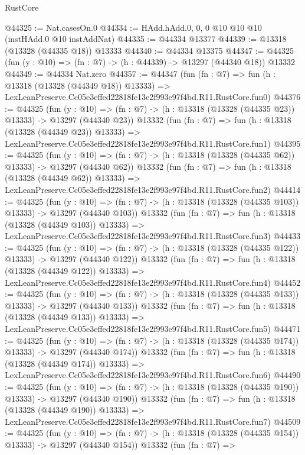 \begin{lexlean}{RustCore}
\begin{coremodule}
@44325 := Nat.casesOn.{0}
@44334 := HAdd.hAdd.{0, 0, 0} @10 @10 @10 (instHAdd.{0} @10 instAddNat)
@44335 := @44334 @13377
@44339 := @13318 (@13328 (@44335 @18)) @13333
@44340 := @44334 @13375
@44347 := @44325 (fun (y : @10) => (fn : @7) -> (h : @44339) -> @13297 (@44340 @18)) @13332
@44349 := @44334 Nat.zero
@44357 := @44347
    (fun (fn : @7) =>
    fun (h : @13318 (@13328 (@44349 @18)) @13333) =>
    LexLeanPreserve.Cc05e3effed22818fe13e2f993e97f4bd.R11.RustCore.fun0)
@44376 := @44325
    (fun (y : @10) => (fn : @7) -> (h : @13318 (@13328 (@44335 @23)) @13333) -> @13297 (@44340 @23))
    @13332
    (fun (fn : @7) =>
    fun (h : @13318 (@13328 (@44349 @23)) @13333) =>
    LexLeanPreserve.Cc05e3effed22818fe13e2f993e97f4bd.R11.RustCore.fun1)
@44395 := @44325
    (fun (y : @10) => (fn : @7) -> (h : @13318 (@13328 (@44335 @62)) @13333) -> @13297 (@44340 @62))
    @13332
    (fun (fn : @7) =>
    fun (h : @13318 (@13328 (@44349 @62)) @13333) =>
    LexLeanPreserve.Cc05e3effed22818fe13e2f993e97f4bd.R11.RustCore.fun2)
@44414 := @44325
    (fun (y : @10) =>
    (fn : @7) -> (h : @13318 (@13328 (@44335 @103)) @13333) -> @13297 (@44340 @103))
    @13332
    (fun (fn : @7) =>
    fun (h : @13318 (@13328 (@44349 @103)) @13333) =>
    LexLeanPreserve.Cc05e3effed22818fe13e2f993e97f4bd.R11.RustCore.fun3)
@44433 := @44325
    (fun (y : @10) =>
    (fn : @7) -> (h : @13318 (@13328 (@44335 @122)) @13333) -> @13297 (@44340 @122))
    @13332
    (fun (fn : @7) =>
    fun (h : @13318 (@13328 (@44349 @122)) @13333) =>
    LexLeanPreserve.Cc05e3effed22818fe13e2f993e97f4bd.R11.RustCore.fun4)
@44452 := @44325
    (fun (y : @10) =>
    (fn : @7) -> (h : @13318 (@13328 (@44335 @133)) @13333) -> @13297 (@44340 @133))
    @13332
    (fun (fn : @7) =>
    fun (h : @13318 (@13328 (@44349 @133)) @13333) =>
    LexLeanPreserve.Cc05e3effed22818fe13e2f993e97f4bd.R11.RustCore.fun5)
@44471 := @44325
    (fun (y : @10) =>
    (fn : @7) -> (h : @13318 (@13328 (@44335 @174)) @13333) -> @13297 (@44340 @174))
    @13332
    (fun (fn : @7) =>
    fun (h : @13318 (@13328 (@44349 @174)) @13333) =>
    LexLeanPreserve.Cc05e3effed22818fe13e2f993e97f4bd.R11.RustCore.fun6)
@44490 := @44325
    (fun (y : @10) =>
    (fn : @7) -> (h : @13318 (@13328 (@44335 @190)) @13333) -> @13297 (@44340 @190))
    @13332
    (fun (fn : @7) =>
    fun (h : @13318 (@13328 (@44349 @190)) @13333) =>
    LexLeanPreserve.Cc05e3effed22818fe13e2f993e97f4bd.R11.RustCore.fun7)
@44509 := @44325
    (fun (y : @10) =>
    (fn : @7) -> (h : @13318 (@13328 (@44335 @154)) @13333) -> @13297 (@44340 @154))
    @13332
    (fun (fn : @7) =>

\end{coremodule}
\end{lexlean}
